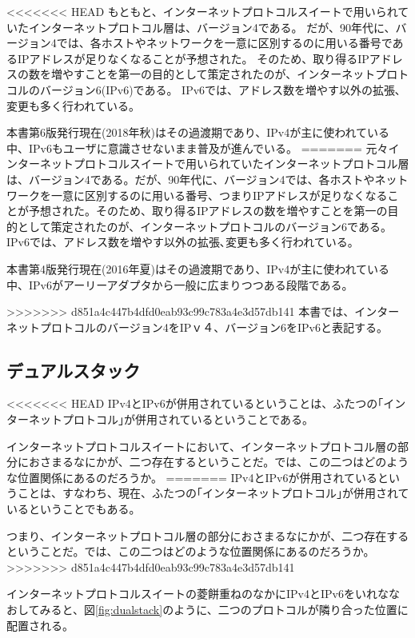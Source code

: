 \begin{itemize}
<<<<<<< HEAD
もともと、インターネットプロトコルスイートで用いられていたインターネットプロトコル層は、バージョン4である。
だが、90年代に、バージョン4では、各ホストやネットワークを一意に区別するのに用いる番号であるIPアドレスが足りなくなることが予想された。
そのため、取り得るIPアドレスの数を増やすことを第一の目的として策定されたのが、インターネットプロトコルのバージョン6(IPv6)である。
IPv6では、アドレス数を増やす以外の拡張､変更も多く行われている。

本書第6版発行現在(2018年秋)はその過渡期であり、IPv4が主に使われている中、IPv6もユーザに意識させないまま普及が進んでいる。
=======
元々インターネットプロトコルスイートで用いられていたインターネットプロトコル層は、バージョン4である。だが、90年代に、バージョン4では、各ホストやネットワークを一意に区別するのに用いる番号、つまりIPアドレスが足りなくなることが予想された。そのため、取り得るIPアドレスの数を増やすことを第一の目的として策定されたのが、インターネットプロトコルのバージョン6である。IPv6では、アドレス数を増やす以外の拡張､変更も多く行われている。

本書第4版発行現在(2016年夏)はその過渡期であり、IPv4が主に使われている中、IPv6がアーリーアダプタから一般に広まりつつある段階である。

>>>>>>> d851a4c447b4dfd0eab93c99c783a4e3d57db141
本書では、インターネットプロトコルのバージョン4をIPｖ４、バージョン6をIPv6と表記する。

\subsection{デュアルスタック}

<<<<<<< HEAD
IPv4とIPv6が併用されているということは、ふたつの｢インターネットプロトコル｣が併用されているということである。

インターネットプロトコルスイートにおいて、インターネットプロトコル層の部分におさまるなにかが、二つ存在するということだ。では、この二つはどのような位置関係にあるのだろうか。
=======
IPv4とIPv6が併用されているということは、すなわち、現在、ふたつの｢インターネットプロトコル｣が併用されているということでもある。

つまり、インターネットプロトコル層の部分におさまるなにかが、二つ存在するということだ。では、この二つはどのような位置関係にあるのだろうか。
>>>>>>> d851a4c447b4dfd0eab93c99c783a4e3d57db141

インターネットプロトコルスイートの菱餅重ねのなかにIPv4とIPv6をいれななおしてみると、図\ref{fig:dualstack}のように、二つのプロトコルが隣り合った位置に配置される。


\end{itemize}

